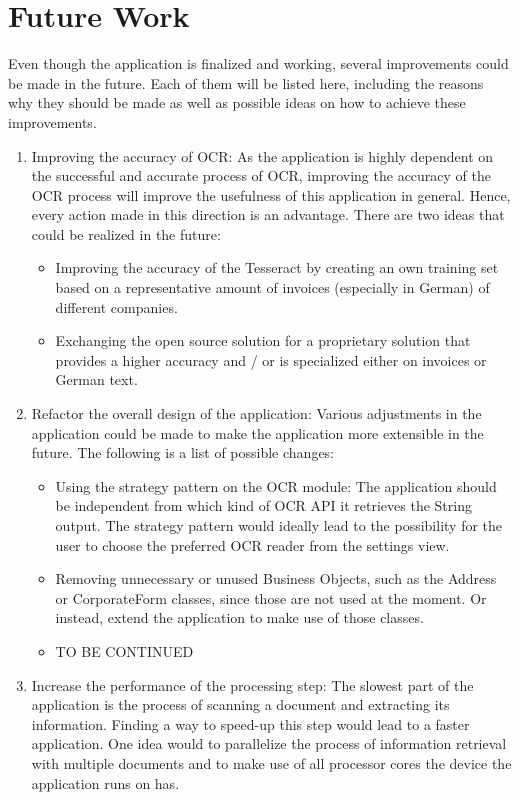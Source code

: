 \section{Future Work}
\label{sec6.2}
Even though the application is finalized and working, several improvements could be made in the future.
Each of them will be listed here, including the reasons why they should be made as well as possible ideas on how to achieve these improvements.
\begin{enumerate}
	\item Improving the accuracy of OCR: As the application is highly dependent on the successful and accurate process of OCR, improving the accuracy of the OCR process will improve the usefulness of this application in general. Hence, every action made in this direction is an advantage. There are two ideas that could be realized in the future: 
	\begin{itemize}
		\item Improving the accuracy of the Tesseract by creating an own training set based on a representative amount of invoices (especially in German) of different companies. 
		\item Exchanging the open source solution for a proprietary solution that provides a higher accuracy and / or is specialized either on invoices or German text.
	\end{itemize}
	\item Refactor the overall design of the application: Various adjustments in the application could be made to make the application more extensible in the future. The following is a list of possible changes:
	\begin{itemize}
		\item Using the strategy pattern on the OCR module: The application should be independent from which kind of OCR API it retrieves the String output. The strategy pattern would ideally lead to the possibility for the user to choose the preferred OCR reader from the settings view.
		\item Removing unnecessary or unused Business Objects, such as the Address or CorporateForm classes, since those are not used at the moment. Or instead, extend the application to make use of those classes.
		\item TO BE CONTINUED %
	\end{itemize}
	\item Increase the performance of the processing step: The slowest part of the application is the process of scanning a document and extracting its information. Finding a way to speed-up this step would lead to a faster application. One idea would to parallelize the process of information retrieval with multiple documents and to make use of all processor cores the device the application runs on has.

\end{enumerate}
